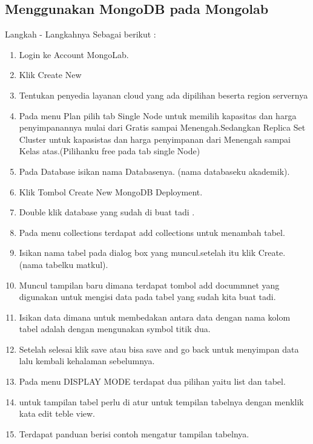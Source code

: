 \subsection{Menggunakan MongoDB pada Mongolab}
Langkah - Langkahnya Sebagai berikut :
\begin{enumerate}
\item 
	Login ke Account MongoLab.
\item
	Klik Create New
\item
	Tentukan penyedia layanan cloud yang ada dipilihan beserta region servernya
\item
	Pada menu Plan pilih tab Single Node untuk memilih kapasitas dan harga penyimpanannya mulai dari Gratis sampai Menengah.Sedangkan Replica Set Cluster untuk kapasistas dan harga penyimpanan dari Menengah sampai Kelas atas.(Pilihanku free pada tab single Node)
\item
	Pada Database isikan nama Databasenya. (nama databaseku akademik).
\item
	Klik Tombol Create New MongoDB Deployment.
\item
	Double klik database yang sudah di buat tadi .
\item
	Pada menu collections terdapat add collections untuk menambah tabel.
\item
	Isikan nama tabel pada dialog box yang muncul.setelah itu klik Create. (nama tabelku matkul).
\item
	Muncul tampilan baru dimana terdapat tombol add docummnet yang digunakan untuk mengisi data pada tabel yang sudah kita buat tadi.
\item
Isikan data dimana untuk membedakan antara data dengan nama kolom tabel adalah dengan mengunakan symbol titik dua.
\item
	Setelah selesai klik save atau bisa save and go back untuk menyimpan data lalu kembali kehalaman sebelumnya.
\item
	Pada menu DISPLAY MODE terdapat dua pilihan yaitu list dan tabel. 
\item
untuk tampilan tabel perlu di atur untuk tempilan tabelnya dengan menklik kata edit teble view.
\item
Terdapat panduan berisi contoh mengatur tampilan tabelnya.
\end{enumerate}

